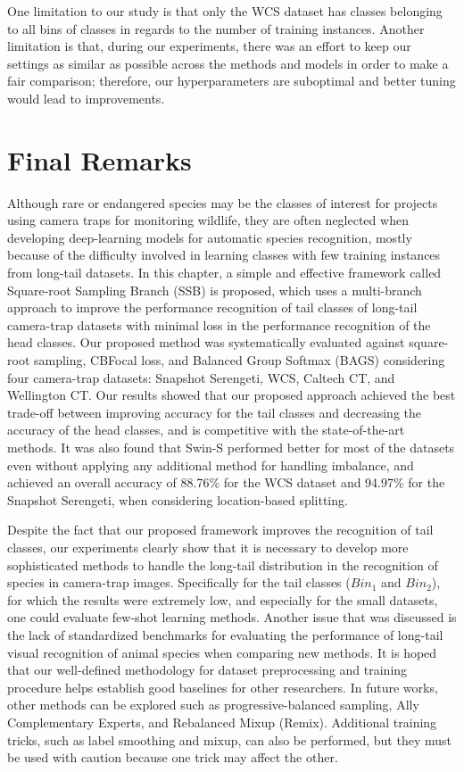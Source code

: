 One limitation to our study is that only the WCS dataset has classes belonging
to all bins of classes in regards to the number of training instances. Another
limitation is that, during our experiments, there was an effort to keep our
settings as similar as possible across the methods and models in order to make a
fair comparison; therefore, our hyperparameters are suboptimal and better tuning
would lead to improvements.

\section{Final Remarks}

Although rare or endangered species may be the classes of interest for projects
using camera traps for monitoring wildlife, they are often neglected when
developing deep-learning models for automatic species recognition, mostly
because of the difficulty involved in learning classes with few training
instances from long-tail datasets. In this chapter, a simple and effective
framework called Square-root Sampling Branch (SSB) is proposed, which uses a
multi-branch approach to improve the performance recognition of tail classes of
long-tail camera-trap datasets with minimal loss in the performance recognition
of the head classes. Our proposed method was systematically evaluated against
square-root sampling, CBFocal loss, and Balanced Group Softmax (BAGS)
considering four camera-trap datasets: Snapshot Serengeti, WCS, Caltech CT, and
Wellington CT. Our results showed that our proposed approach achieved the best
trade-off between improving accuracy for the tail classes and decreasing the
accuracy of the head classes, and is competitive with the state-of-the-art
methods. It was also found that Swin-S performed better for most of the datasets
even without applying any additional method for handling imbalance, and achieved
an overall accuracy of 88.76\% for the WCS dataset and 94.97\% for the Snapshot
Serengeti, when considering location-based splitting.

Despite the fact that our proposed framework improves the recognition of tail
classes, our experiments clearly show that it is necessary to develop more
sophisticated methods to handle the long-tail distribution in the recognition of
species in camera-trap images. Specifically for the tail classes ($Bin_1$ and
$Bin_2$), for which the results were extremely low, and especially for the small
datasets, one could evaluate few-shot learning methods. Another issue that was
discussed is the lack of standardized benchmarks for evaluating the performance
of long-tail visual recognition of animal species when comparing new methods. It
is hoped that our well-defined methodology for dataset preprocessing and
training procedure helps establish good baselines for other researchers. In
future works, other methods can be explored such as progressive-balanced
sampling, Ally Complementary Experts, and Rebalanced Mixup (Remix). Additional
training tricks, such as label smoothing and mixup, can also be performed, but
they must be used with caution because one trick may affect the other.

